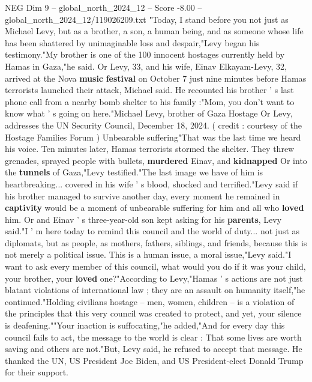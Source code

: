 \begin{textsample}{NEG Dim 9 – global\_north\_2024\_12 – Score -8.00 – global\_north\_2024\_12/119026209.txt}  \label{ex:f9_neg_116}
"Today, I stand before you not just as Michael Levy, but as a brother, a son, a human being, and as someone whose life has been shattered by unimaginable loss and despair,"Levy began his testimony."My brother is one of the 100 innocent hostages currently held by Hamas in Gaza,"he said.
Or Levy, 33, and his wife, Einav Elkayam-Levy, 32, arrived at the Nova \textbf{music} \textbf{festival} on October 7 just nine minutes before Hamas terrorists launched their attack, Michael said.
He recounted his brother ' s last phone call from a nearby bomb shelter to his family :"Mom, you don't want to know what ' s going on here."Michael Levy, brother of Gaza Hostage Or Levy, addresses the UN Security Council, December 18, 2024. ( credit : courtesy of the Hostage Families Forum ) Unbearable suffering"That was the last time we heard his voice.
Ten minutes later, Hamas terrorists stormed the shelter.
They threw grenades, sprayed people with bullets, \textbf{murdered} Einav, and \textbf{kidnapped} Or into the \textbf{tunnels} of Gaza,"Levy testified."The last image we have of him is heartbreaking... covered in his wife ' s blood, shocked and terrified."Levy said if his brother managed to survive another day, every moment he remained in \textbf{captivity} would be a moment of unbearable suffering for him and all who \textbf{loved} him.
Or and Einav ' s three-year-old son kept asking for his \textbf{parents}, Levy said."I ' m here today to remind this council and the world of duty... not just as diplomats, but as people, as mothers, fathers, siblings, and friends, because this is not merely a political issue.
This is a human issue, a moral issue,"Levy said."I want to ask every member of this council, what would you do if it was your child, your brother, your \textbf{loved} one?"According to Levy,"Hamas ' s actions are not just blatant violations of international law ; they are an assault on humanity itself,"he continued."Holding civilians hostage -- men, women, children -- is a violation of the principles that this very council was created to protect, and yet, your silence is deafening.""Your inaction is suffocating,"he added,"And for every day this council fails to act, the message to the world is clear : That some lives are worth saving and others are not."But, Levy said, he refused to accept that message.
He thanked the UN, US President Joe Biden, and US President-elect Donald Trump for their support.

\end{textsample}
